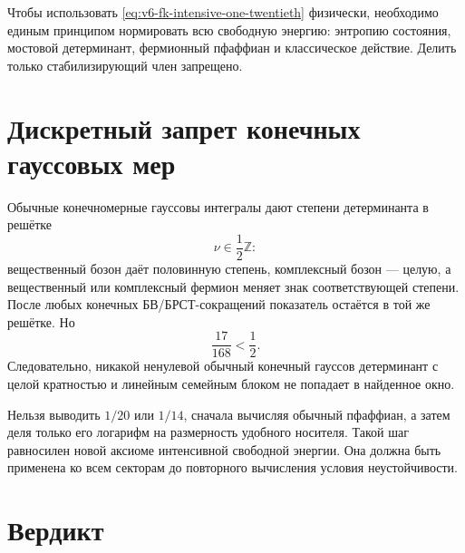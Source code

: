 Чтобы использовать \eqref{eq:v6-fk-intensive-one-twentieth} физически,
необходимо единым принципом нормировать всю свободную энергию: энтропию
состояния, мостовой детерминант, фермионный пфаффиан и классическое
действие. Делить только стабилизирующий член запрещено.

\section{Дискретный запрет конечных гауссовых мер}

Обычные конечномерные гауссовы интегралы дают степени детерминанта в
решётке
\begin{equation}
 \nu\in\frac12\mathbb Z:
\end{equation}
вещественный бозон даёт половинную степень, комплексный бозон --- целую,
а вещественный или комплексный фермион меняет знак соответствующей
степени. После любых конечных БВ/БРСТ-сокращений показатель остаётся в той
же решётке. Но
\begin{equation}
 \frac{17}{168}<\frac12.
\end{equation}
Следовательно, никакой ненулевой обычный конечный гауссов детерминант с
целой кратностью и линейным семейным блоком не попадает в найденное окно.

\begin{nogocriterion}
Нельзя выводить $1/20$ или $1/14$, сначала вычисляя обычный пфаффиан, а
затем деля только его логарифм на размерность удобного носителя. Такой шаг
равносилен новой аксиоме интенсивной свободной энергии. Она должна быть
применена ко всем секторам до повторного вычисления условия
неустойчивости.
\end{nogocriterion}

\section{Вердикт}


